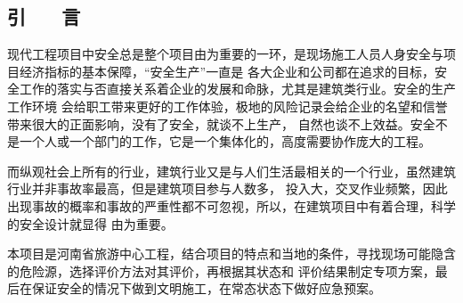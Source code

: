 \begin{center}
    \section*{  \textbf{引 ~~ 言}}
\end{center}

\vskip0.5cm
现代工程项目中安全总是整个项目由为重要的一环，是现场施工人员人身安全与项目经济指标的基本保障，“安全生产”一直是
各大企业和公司都在追求的目标，安全工作的落实与否直接关系着企业的发展和命脉，尤其是建筑类行业。安全的生产工作环境
会给职工带来更好的工作体验，极地的风险记录会给企业的名望和信誉带来很大的正面影响，没有了安全，就谈不上生产，
自然也谈不上效益。安全不是一个人或一个部门的工作，它是一个集体化的，高度需要协作庞大的工程。

而纵观社会上所有的行业，建筑行业又是与人们生活最相关的一个行业，虽然建筑行业并非事故率最高，但是建筑项目参与人数多，
投入大，交叉作业频繁，因此出现事故的概率和事故的严重性都不可忽视，所以，在建筑项目中有着合理，科学的安全设计就显得
由为重要。

本项目是河南省旅游中心工程，结合项目的特点和当地的条件，寻找现场可能隐含的危险源，选择评价方法对其评价，再根据其状态和
评价结果制定专项方案，最后在保证安全的情况下做到文明施工，在常态状态下做好应急预案。
\pagestyle{fancy}
